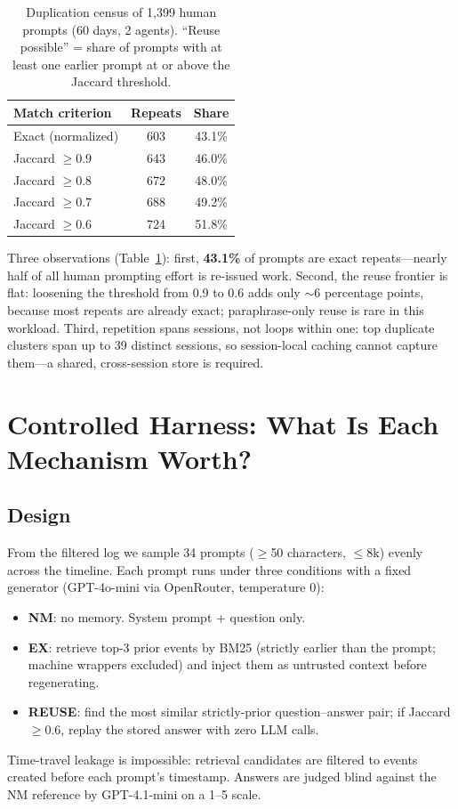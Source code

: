 \documentclass{article}
\begin{document}
\begin{table}[t]
\centering
\caption{Duplication census of 1{,}399 human prompts (60 days, 2 agents).
``Reuse possible'' = share of prompts with at least one earlier prompt at or
above the Jaccard threshold.}
\label{tab:census}
\begin{tabular}{lcc}
\toprule
Match criterion & Repeats & Share \\
\midrule
Exact (normalized) & 603 & 43.1\% \\
Jaccard $\geq 0.9$ & 643 & 46.0\% \\
Jaccard $\geq 0.8$ & 672 & 48.0\% \\
Jaccard $\geq 0.7$ & 688 & 49.2\% \\
Jaccard $\geq 0.6$ & 724 & 51.8\% \\
\bottomrule
\end{tabular}
\end{table}

Three observations (Table~\ref{tab:census}): first, \textbf{43.1\%} of
prompts are exact repeats---nearly half of all human prompting effort is
re-issued work. Second, the reuse frontier is flat: loosening the threshold
from 0.9 to 0.6 adds only $\sim$6 percentage points, because most repeats
are already exact; paraphrase-only reuse is rare in this workload. Third,
repetition spans sessions, not loops within one: top duplicate clusters
span up to 39 distinct sessions, so session-local caching cannot capture
them---a shared, cross-session store is required.

\section{Controlled Harness: What Is Each Mechanism Worth?}
\label{sec:harness}

\subsection{Design}
From the filtered log we sample 34 prompts ($\geq$50 characters, $\leq$8k)
evenly across the timeline. Each prompt runs under three conditions with a
fixed generator (GPT-4o-mini via OpenRouter, temperature 0):
\begin{itemize}[leftmargin=*,nosep]
\item \textbf{NM}: no memory. System prompt + question only.
\item \textbf{EX}: retrieve top-3 prior events by BM25 (strictly earlier than
the prompt; machine wrappers excluded) and inject them as untrusted context
before regenerating.
\item \textbf{REUSE}: find the most similar strictly-prior
question--answer pair; if Jaccard $\geq 0.6$, replay the stored answer with
zero LLM calls.
\end{itemize}
Time-travel leakage is impossible: retrieval candidates are filtered to
events created before each prompt's timestamp. Answers are judged blind
against the NM reference by GPT-4.1-mini on a 1--5 scale.
\end{document}
